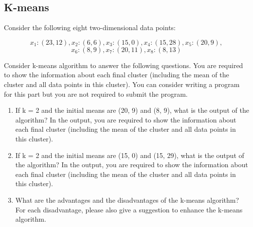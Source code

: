 \documentclass{article}
\begin{document}
\subsection*{K-means}

Consider the following eight two-dimensional data points:

\[x_1: (23, 12), x_2: (6, 6), x_3: (15, 0), x_4: (15, 28), x_5: (20, 9),\] 
\[x_6: (8, 9), x_7: (20, 11), x_8: (8,13)\]

Consider k-means algorithm to answer the following questions. You are required to show the information about each final cluster (including the mean of the cluster and all data points in this cluster). You can consider writing a program for this part but you are not required to submit the program.

\begin{enumerate}
    \item If k = 2 and the initial means are (20, 9) and (8, 9), what is the output of the
    algorithm? In the output, you are required to show the information about each final cluster (including the mean of the cluster and all data points in this cluster).
    \item If k = 2 and the initial means are (15, 0) and (15, 29), what is the output of the
    algorithm? In the output, you are required to show the information about each final cluster (including the mean of the cluster and all data points in this cluster).
    \item What are the advantages and the disadvantages of the k-means algorithm? For each disadvantage, please also give a suggestion to enhance the k-means algorithm.
\end{enumerate}
\end{document}
